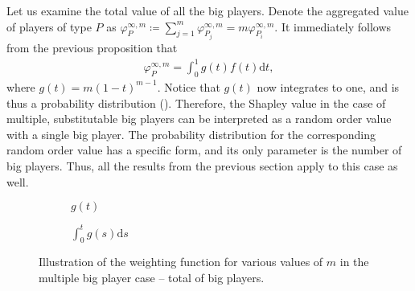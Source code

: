 \documentclass[a4paper]{article}
\newcommand{\dt}{\mathrm{d}t}
\newcommand{\ds}{\mathrm{d}s}
\begin{document}
Let us examine the total value of all the big players.
Denote the aggregated value of players of type $P$ as $\varphi_{P}^{\infty, m} \coloneqq \sum_{j=1}^m\varphi_{P_j}^{\infty, m} = m\varphi_{P_i}^{\infty, m}$.
It immediately follows from the previous proposition that
\begin{align*}
    \varphi_{P}^{\infty, m} = \int_0^1 g(t) f(t) \dt,
\end{align*}
where $g(t) = m (1-t) ^ {m-1}$.
Notice that $g(t)$ now integrates to one, and is thus a probability distribution ().
Therefore, the Shapley value in the case of multiple, substitutable big players can be interpreted as a random order value with a single big player.
The probability distribution for the corresponding random order value has a specific form, and its only parameter is the number of big players.
Thus, all the results from the previous section apply to this case as well.

\begin{figure}[ht]
    \centering
    \begin{subfigure}[b]{0.45\textwidth}
        \centering
        \caption{$g(t)$}
    \end{subfigure}
    \begin{subfigure}[b]{0.45\textwidth}
        \centering
        \caption{$\int_0^t g(s) \ds$}
    \end{subfigure}
    \caption{Illustration of the weighting function for various values of $m$ in the multiple big player case -- total of big players.}
    \label{fig:multiple_platforms_total}
\end{figure}
\end{document}
